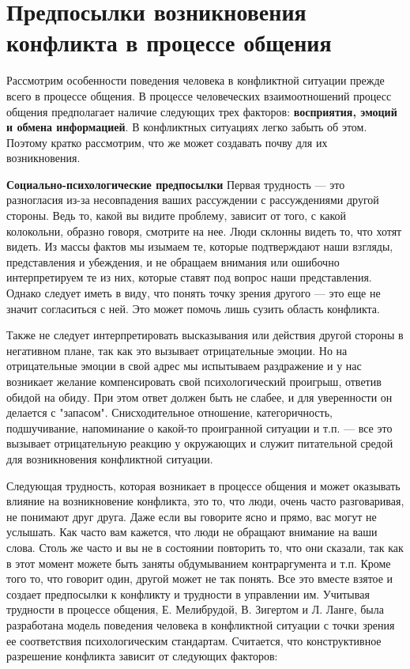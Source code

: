 \documentclass[a4paper,14pt]{extarticle}
\begin{document}
\pagebreak
\section{Предпосылки возникновения конфликта в процессе общения}

Рассмотрим особенности поведения человека в конфликтной ситуации прежде всего в процессе общения. В процессе человеческих взаимоотношений процесс общения предполагает наличие следующих трех факторов: \textbf{восприятия, эмоций и обмена информацией}. В конфликтных ситуациях легко забыть об этом. Поэтому кратко рассмотрим, что же может создавать почву для их возникновения.

\textbf{Социально-психологические предпосылки} Первая трудность — это разногласия из-за несовпадения ваших рассуждении с рассуждениями другой стороны. Ведь то, какой вы видите проблему, зависит от того, с какой колокольни, образно говоря, смотрите на нее. Люди склонны видеть то, что хотят видеть. Из массы фактов мы изымаем те, которые подтверждают наши взгляды, представления и убеждения, и не обращаем внимания или ошибочно интерпретируем те из них, которые ставят под вопрос наши представления. Однако следует иметь в виду, что понять точку зрения другого — это еще не значит согласиться с ней. Это может помочь лишь сузить область конфликта.

\hfill

Также не следует интерпретировать высказывания или действия другой стороны в негативном плане, так как это вызывает отрицательные эмоции. Но на отрицательные эмоции в свой адрес мы испытываем раздражение и у нас возникает желание компенсировать свой психологический проигрыш, ответив обидой на обиду. При этом ответ должен быть не слабее, и для уверенности он делается с "запасом". Снисходительное отношение, категоричность, подшучивание, напоминание о какой-то проигранной ситуации и т.п. — все это вызывает отрицательную реакцию у окружающих и служит питательной средой для возникновения конфликтной ситуации.

\hfill
Следующая трудность, которая возникает в процессе общения и может оказывать влияние на возникновение конфликта, это то, что люди, очень часто разговаривая, не понимают друг друга. Даже если вы говорите ясно и прямо, вас могут не услышать. Как часто вам кажется, что люди не обращают внимание на ваши слова. Столь же часто и вы не в состоянии повторить то, что они сказали, так как в этот момент можете быть заняты обдумыванием контраргумента и т.п. Кроме того то, что говорит один, другой может не так понять. Все это вместе взятое и создает предпосылки к конфликту и трудности в управлении им.
Учитывая трудности в процессе общения, Е.  Мелибрудой, В. Зигертом и Л. Ланге, была разработана модель поведения человека в конфликтной ситуации с точки зрения ее соответствия психологическим стандартам. Считается, что конструктивное разрешение конфликта зависит от следующих факторов:
\end{document}

